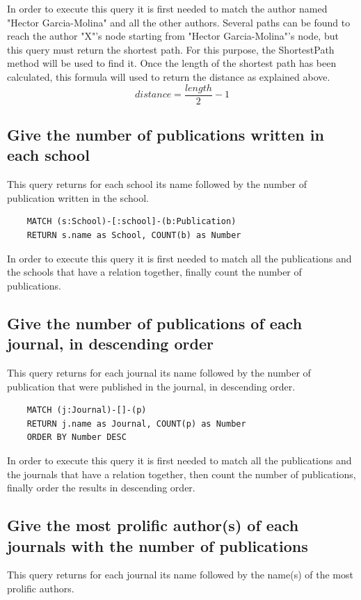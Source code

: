 \documentclass{article}
\begin{document}
In order to execute this query it is first needed to match the author named "Hector Garcia-Molina" and all the other authors. Several paths can be  found to reach the author "X"'s node starting from "Hector Garcia-Molina"'s node, but this query must return the shortest path. For this purpose, the ShortestPath method will be used to find it. Once the  length of the shortest path has been calculated, this formula will used to return the distance as explained above. $$ distance =  \frac{length}{2} - 1 $$

\subsection{Give the number of publications written in each school}
This query returns for each school its name followed by the number of publication written in the school.

\begin{lstlisting}
    MATCH (s:School)-[:school]-(b:Publication)
    RETURN s.name as School, COUNT(b) as Number
\end{lstlisting}

In order to execute this query it is first needed to match all the publications and the schools that have a relation together, finally count the number of publications.

\subsection{Give the number of publications of each journal, in descending order}
This query returns for each journal its name followed by the number of publication that were published in the journal, in descending order.

\begin{lstlisting}
    MATCH (j:Journal)-[]-(p)
    RETURN j.name as Journal, COUNT(p) as Number
    ORDER BY Number DESC
\end{lstlisting}

In order to execute this query it is first needed to match all the publications and the journals that have a relation together, then count the number of publications, finally order the results in descending order.

\subsection{Give the most prolific author(s) of each journals with the number of publications}
This query returns for each journal its name followed by the name(s) of the most prolific authors.
\end{document}
